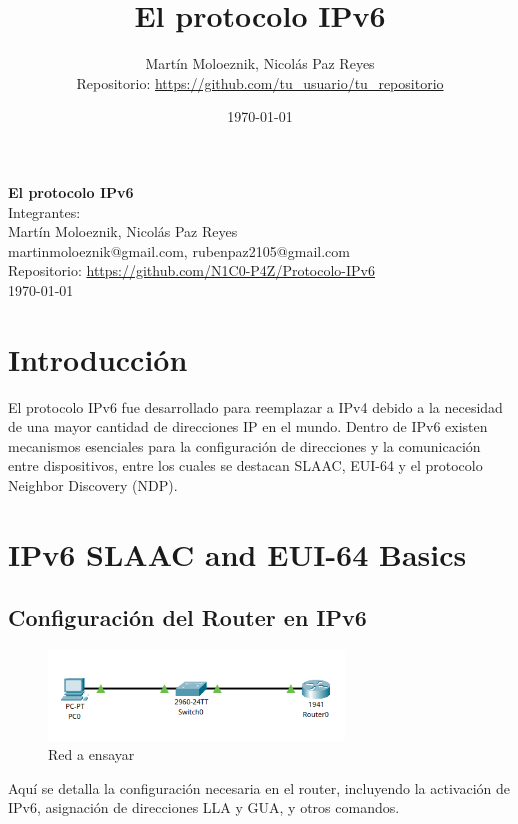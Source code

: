 \documentclass[a4paper,12pt]{article}
\title{El protocolo IPv6}
\author{Martín Moloeznik, Nicolás Paz Reyes\\[0.5em]
Repositorio: \url{https://github.com/tu_usuario/tu_repositorio}}
\date{\today}
\begin{document}
\begin{titlepage}
  \centering
  \vspace*{2cm}
  {\large \textbf{El protocolo IPv6}}\\[1.5cm]
  
  {\large Integrantes:}\\
   \bigskip
  {\large Martín Moloeznik, Nicolás Paz Reyes} \\[0.5cm]
  {\large {martinmoloeznik@gmail.com}, {rubenpaz2105@gmail.com}} \\[0.5cm]
  \bigskip
  {\large Repositorio: \url{https://github.com/N1C0-P4Z/Protocolo-IPv6}}\\[1cm]
  
  \vfill
  {\large \today}
\end{titlepage}

\tableofcontents
\newpage

\section{Introducción}
El protocolo IPv6 fue desarrollado para reemplazar a IPv4 debido a la necesidad de una mayor cantidad de direcciones IP en el mundo. Dentro de IPv6 existen mecanismos esenciales para la configuración de direcciones y la comunicación entre dispositivos, entre los cuales se destacan SLAAC, EUI-64 y el protocolo Neighbor Discovery (NDP).

\section{IPv6 SLAAC and EUI-64 Basics}
\subsection{Configuración del Router en IPv6}
\begin{figure}[H]
  \centering
  \includegraphics[width=0.7\textwidth]{imagenes/lab1.png}
  \caption{Red a ensayar}
  \label{fig:lab1}
\end{figure}

Aquí se detalla la configuración necesaria en el router, incluyendo la activación de IPv6, asignación de direcciones LLA y GUA, y otros comandos.
\end{document}
